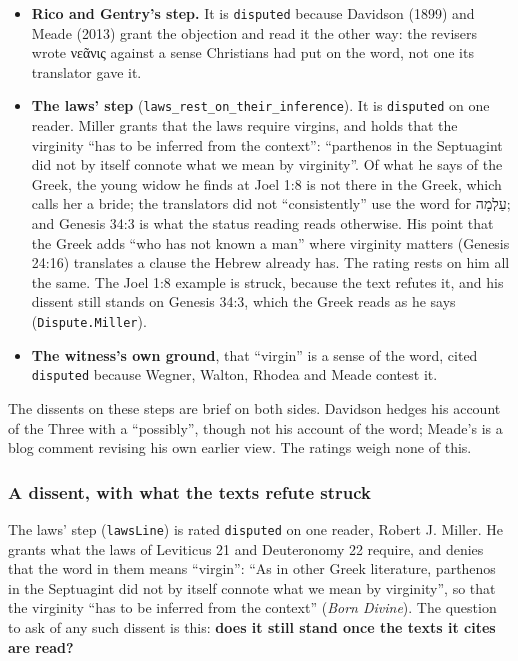 \documentclass[11pt]{article}
\begin{document}
\begin{itemize}
  \item \textbf{Rico and Gentry’s step.} It is \texttt{disputed} because Davidson (1899) and Meade (2013) grant the objection and read it the other way: the revisers wrote νεᾶνις against a sense Christians had put on the word, not one its translator gave it.
  \item \textbf{The laws’ step} (\texttt{laws\_\allowbreak{}rest\_\allowbreak{}on\_\allowbreak{}their\_\allowbreak{}inference}). It is \texttt{disputed} on one reader. Miller grants that the laws require virgins, and holds that the virginity “has to be inferred from the context”: “parthenos in the Septuagint did not by itself connote what we mean by virginity”. Of what he says of the Greek, the young widow he finds at Joel 1:8 is not there in the Greek, which calls her a bride; the translators did not “consistently” use the word for עַלְמָה; and Genesis 34:3 is what the status reading reads otherwise. His point that the Greek adds “who has not known a man” where virginity matters (Genesis 24:16) translates a clause the Hebrew already has. The rating rests on him all the same. The Joel 1:8 example is struck, because the text refutes it, and his dissent still stands on Genesis 34:3, which the Greek reads as he says (\texttt{Dispute.Miller}).
  \item \textbf{The witness’s own ground}, that “virgin” is a sense of the word, cited \texttt{disputed} because Wegner, Walton, Rhodea and Meade contest it.
\end{itemize}
The dissents on these steps are brief on both sides. Davidson hedges his account of the Three with a “possibly”, though not his account of the word; Meade’s is a blog comment revising his own earlier view. The ratings weigh none of this.

\subsubsection*{A dissent, with what the texts refute struck}
The laws’ step (\texttt{laws\allowbreak{}Line}) is rated \texttt{disputed} on one reader, Robert J. Miller. He grants what the laws of Leviticus 21 and Deuteronomy 22 require, and denies that the word in them means “virgin”: “As in other Greek literature, parthenos in the Septuagint did not by itself connote what we mean by virginity”, so that the virginity “has to be inferred from the context” (\emph{Born Divine}). The question to ask of any such dissent is this: \textbf{does it still stand once the texts it cites are read?}
\end{document}
